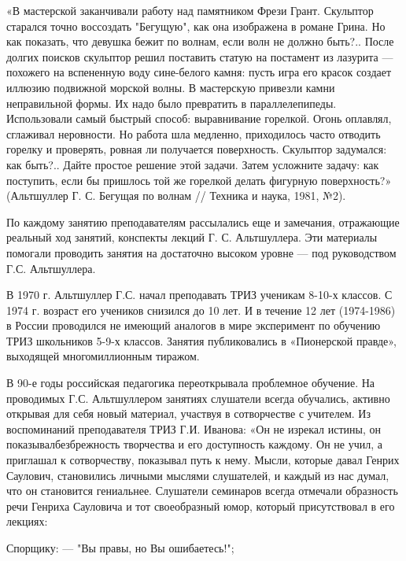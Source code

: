 «В мастерской заканчивали работу над памятником Фрези Грант. Скульптор
старался  точно  воссоздать "Бегущую",  как  она  изображена в  романе
Грина. Но  как показать,  что девушка  бежит по  волнам, если  волн не
должно быть?..  После долгих поисков скульптор  решил поставить статую
на постамент  из лазурита  — похожего  на вспененную  воду сине-белого
камня:  пусть  игра  его  красок  создает  иллюзию  подвижной  морской
волны. В  мастерскую привезли камни  неправильной формы. Их  надо было
превратить  в  параллелепипеды.  Использовали  самый  быстрый  способ:
выравнивание горелкой. Огонь оплавлял, сглаживал неровности. Но работа
шла медленно,  приходилось часто отводить горелку  и проверять, ровная
ли  получается поверхность.  Скульптор  задумался:  как быть?..  Дайте
простое решение  этой задачи.  Затем усложните задачу:  как поступить,
если  бы  пришлось  той  же  горелкой  делать  фигурную  поверхность?»
(Альтшуллер Г. С. Бегущая по волнам // Техника и наука, 1981, №2).




По  каждому  занятию  преподавателям   рассылались  еще  и  замечания,
отражающие реальный  ход занятий, конспекты лекций  Г. С. Альтшуллера.
Эти материалы помогали проводить  занятия на достаточно высоком уровне
— под руководством Г.С. Альтшуллера.

В  1970 г.  Альтшуллер  Г.С. начал  преподавать  ТРИЗ ученикам  8-10-х
классов.  С 1974  г. возраст  его  учеников снизился  до 10  лет. И  в
течение 12  лет (1974-1986)  в России  проводился не  имеющий аналогов
в  мире  эксперимент  по   обучению  ТРИЗ  школьников  5-9-х  классов.
Занятия публиковались в «Пионерской правде», выходящей многомиллионным
тиражом.

В 90-е  годы российская педагогика переоткрывала  проблемное обучение.
На проводимых  Г.С. Альтшуллером занятиях слушатели  всегда обучались,
активно открывая  для себя новый  материал, участвуя в  сотворчестве с
учителем.  Из воспоминаний  преподавателя  ТРИЗ Г.И.  Иванова: «Он  не
изрекал истины, он показывалбезбрежность  творчества и его доступность
каждому.  Он не  учил, а  приглашал к  сотворчеству, показывал  путь к
нему.  Мысли,  которые  давал  Генрих  Саулович,  становились  личными
мыслями  слушателей,  и  каждый  из   нас  думал,  что  он  становится
гениальнее.  Слушатели  семинаров   всегда  отмечали  образность  речи
Генриха Сауловича и тот своеобразный юмор, который присутствовал в его
лекциях:

Спорщику: — "Вы правы, но Вы ошибаетесь!";

